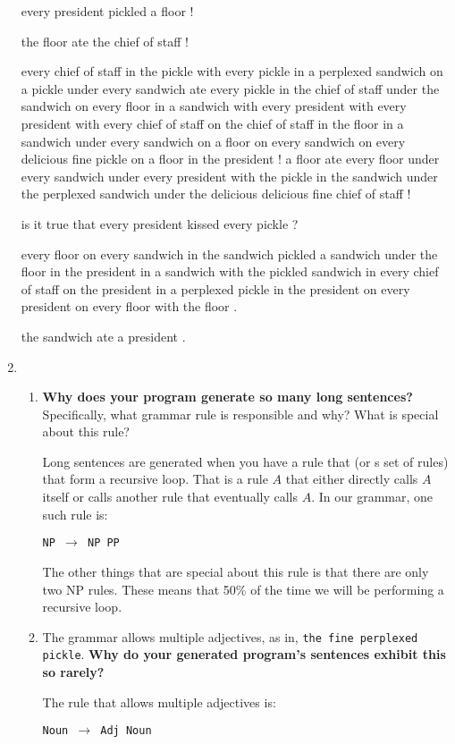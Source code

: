 \documentclass[10pt]{article}
\begin{document}
\begin{enumerate}
{every president pickled a floor !

the floor ate the chief of staff !

every chief of staff in the pickle with every pickle in a perplexed sandwich on a pickle under every sandwich ate every pickle in the chief of staff under the sandwich on every floor in a sandwich with every president with every president with every chief of staff on the chief of staff in the floor in a sandwich under every sandwich on a floor on every sandwich on every delicious fine pickle on a floor in the president !
a floor ate every floor under every sandwich under every president with the pickle in the sandwich under the perplexed sandwich under the delicious delicious fine chief of staff !

is it true that every president kissed every pickle ?

every floor on every sandwich in the sandwich pickled a sandwich under the floor in the president in a sandwich with the pickled sandwich in every chief of staff on the president in a perplexed pickle in the president on every president on every floor with the floor .

the sandwich ate a president .

}

\item\begin{enumerate}
\item {\bf Why does your program generate so many long sentences?}
    Specifically, what grammar rule is responsible and why? What is
    special about this rule?

Long sentences are generated when you have a rule that (or s set of rules) that form a recursive loop. That is a rule $A$ that either directly calls $A$ itself or calls another rule that eventually calls $A$. In our grammar, one such rule is:

{\tt NP $\rightarrow$ NP  PP}

The other things that are special about this rule is that there are only two NP rules. These means that 50\% of the time we will be performing a recursive loop.

\item The grammar allows multiple adjectives, as in, \verb|the fine perplexed pickle|. 
{\bf Why do your generated program's sentences exhibit this so rarely?}

The rule that allows multiple adjectives is:

{\tt Noun $\rightarrow$ Adj Noun}


\end{enumerate}
\end{enumerate}
\end{document}
